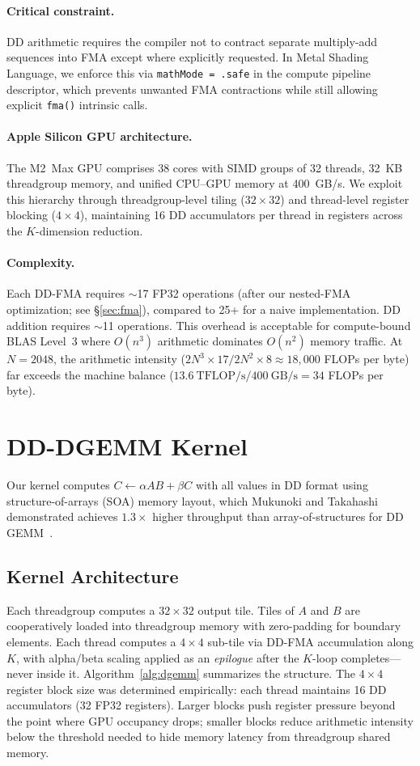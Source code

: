 \documentclass[conference]{IEEEtran}
\begin{document}
\paragraph{Critical constraint.} DD arithmetic requires the compiler not to contract separate multiply-add sequences into FMA except where explicitly requested. In Metal Shading Language, we enforce this via \texttt{mathMode = .safe} in the compute pipeline descriptor, which prevents unwanted FMA contractions while still allowing explicit \texttt{fma()} intrinsic calls.
\paragraph{Apple Silicon GPU architecture.} The M2~Max GPU comprises 38 cores with SIMD groups of 32 threads, 32~KB threadgroup memory, and unified CPU--GPU memory at 400~GB/s. We exploit this hierarchy through threadgroup-level tiling ($32 \times 32$) and thread-level register blocking ($4 \times 4$), maintaining 16 DD accumulators per thread in registers across the $K$-dimension reduction.
\paragraph{Complexity.} Each DD-FMA requires ${\sim}$17 FP32 operations (after our nested-FMA optimization; see \S\ref{sec:fma}), compared to 25+ for a naive implementation. DD addition requires ${\sim}$11 operations. This overhead is acceptable for compute-bound BLAS Level~3 where $O(n^3)$ arithmetic dominates $O(n^2)$ memory traffic. At $N{=}2048$, the arithmetic intensity ($2N^3 \times 17 / 2N^2 \times 8 \approx 18{,}000$ FLOPs per byte) far exceeds the machine balance ($13.6~\text{TFLOP/s} / 400~\text{GB/s} = 34$ FLOPs per byte).
\section{DD-DGEMM Kernel}
\label{sec:dgemm}
Our kernel computes $C \gets \alpha AB + \beta C$ with all values in DD format using structure-of-arrays (SOA) memory layout, which Mukunoki and Takahashi demonstrated achieves $1.3{\times}$ higher throughput than array-of-structures for DD GEMM~\cite{Mukunoki2012}.
\subsection{Kernel Architecture}
Each threadgroup computes a $32 \times 32$ output tile. Tiles of $A$ and $B$ are cooperatively loaded into threadgroup memory with zero-padding for boundary elements. Each thread computes a $4 \times 4$ sub-tile via DD-FMA accumulation along $K$, with alpha/beta scaling applied as an \emph{epilogue} after the $K$-loop completes---never inside it. Algorithm~\ref{alg:dgemm} summarizes the structure.
The $4 \times 4$ register block size was determined empirically: each thread maintains 16 DD accumulators (32 FP32 registers). Larger blocks push register pressure beyond the point where GPU occupancy drops; smaller blocks reduce arithmetic intensity below the threshold needed to hide memory latency from threadgroup shared memory.
\end{document}
